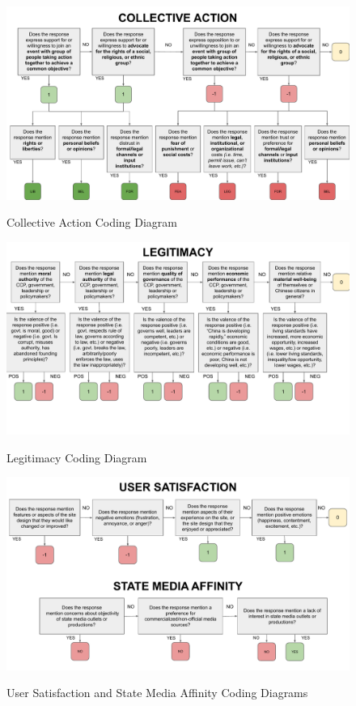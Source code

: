 \documentclass[11pt]{article}
\begin{document}
\begin{figure}
  \centering
  \caption{Collective Action Coding Diagram}
  \vspace{1em}
  \includegraphics[width=\textwidth]{figures/coding_diagrams/collective_action.pdf}
  \label{collective_action}
\end{figure}

\begin{figure}
  \centering
  \caption{Legitimacy Coding Diagram}
  \vspace{1em}
  \includegraphics[width=\textwidth]{figures/coding_diagrams/legitimacy.pdf}
  \label{legitimacy}
\end{figure}

\begin{figure}
  \centering
  \caption{User Satisfaction and State Media Affinity Coding Diagrams}
  \vspace{1em}
  \includegraphics[width=\textwidth]{figures/coding_diagrams/user_sat_state_media.pdf}
  \label{user_sat_state_media}
\end{figure}
\end{document}
